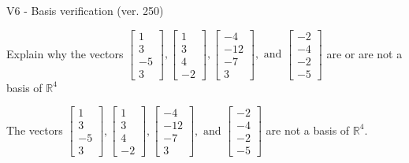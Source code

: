 \begin{exercise}
  \begin{exerciseTitle}V6 - Basis verification (ver. 250)\end{exerciseTitle}
  \begin{exerciseStatement}
    Explain why the vectors \(\left[\begin{array}{r}
1 \\
3 \\
-5 \\
3
\end{array}\right] , \left[\begin{array}{r}
1 \\
3 \\
4 \\
-2
\end{array}\right] , \left[\begin{array}{r}
-4 \\
-12 \\
-7 \\
3
\end{array}\right] , \text{ and } \left[\begin{array}{r}
-2 \\
-4 \\
-2 \\
-5
\end{array}\right]\) are or are not a basis of \(\mathbb{R}^4\)	


  \end{exerciseStatement}
  \begin{exerciseAnswer}
   The vectors \(\left[\begin{array}{r}
1 \\
3 \\
-5 \\
3
\end{array}\right] , \left[\begin{array}{r}
1 \\
3 \\
4 \\
-2
\end{array}\right] , \left[\begin{array}{r}
-4 \\
-12 \\
-7 \\
3
\end{array}\right] , \text{ and } \left[\begin{array}{r}
-2 \\
-4 \\
-2 \\
-5
\end{array}\right]\) 
  	 are not  a basis of \(\mathbb{R}^4\).
  


  \end{exerciseAnswer}
\end{exercise}